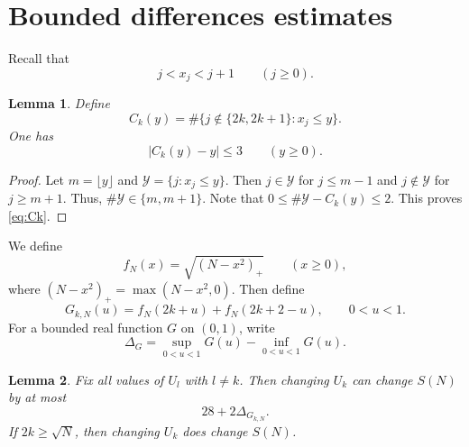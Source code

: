 \documentclass[12pt,reqno]{amsart}
\theoremstyle{plain}
\newtheorem{lemma}{Lemma}[section]
\theoremstyle{definition}
\begin{document}
\section{Bounded differences estimates}

\setcounter{equation}{0}

Recall that
\begin{equation*}
 j<x_j<j+1\qquad(j\ge0).
\end{equation*}

\begin{lemma}\label{lem:one-per-interval}Define
\[
 C_k(y)=\#\{j\notin\{2k,2k+1\}:x_j\le y\}.
\]
One has
\begin{equation}\label{eq:Ck}
 |C_k(y)-y|\le3\qquad(y\ge0).
\end{equation}
\end{lemma}

\begin{proof}
Let $m=\lfloor y\rfloor$ and $\mathcal{Y}=\{j:x_j\le y\}$. Then $j\in \mathcal{Y}$ for $j\le m-1$ and $j\not\in \mathcal{Y}$ for $j\ge m+1$. Thus, $\#\mathcal{Y}\in \{m,m+1\}$. Note that $0\le \#\mathcal{Y}-C_k(y)\le 2$. This proves \eqref{eq:Ck}.
\end{proof}

We define
\begin{equation*}
 f_N(x)=\sqrt{(N-x^2)_+}\qquad(x\ge0),
\end{equation*}
where $(N-x^2)_+=\max(N-x^2,0)$. Then define
\begin{equation}\label{eq:Gk}
 G_{k,N}(u)=f_N(2k+u)+f_N(2k+2-u),\qquad0<u<1.
\end{equation}
For a bounded real function $G$ on $(0,1)$, write
$$\Delta_G=\sup_{0<u<1}G(u)-\inf_{0<u<1}G(u).$$

\begin{lemma}\label{lem:coordinatechange}
Fix all values of $U_l$ with $l\ne k$. Then changing $U_k$ can change
$S(N)$ by at most
\begin{equation}\label{eq:coordinatebound}
 28+2\Delta_{G_{k,N}}.
\end{equation}
If $2k\ge \sqrt{N}$, then changing $U_k$ does change
$S(N)$.
\end{lemma}
\end{document}
